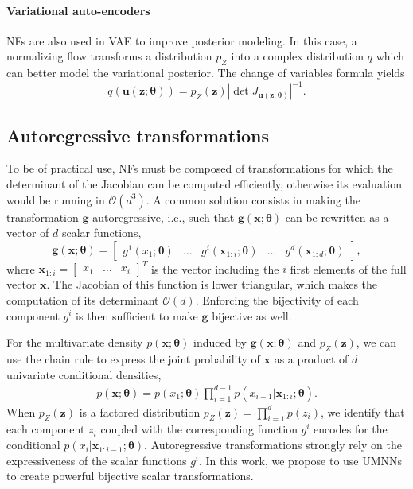 \documentclass{article}
\newcommand{\mc}{\mathcal}
\newcommand{\mb}{\boldsymbol}
\begin{document}
\paragraph{Variational auto-encoders}
NFs are also used in VAE to improve posterior modeling.
In this case, a normalizing flow transforms a distribution $p_Z$ into a complex distribution $q$ which can better model the variational posterior.
The change of variables formula yields
\begin{equation}
    q(\mb{u}(\mb{z}; \mb{\theta})) = p_Z(\mb{z}) \left|\det J_{\mb{u}(\mb{z};\mb{\theta})} \right|^{-1}.\label{eq:NF_VI}
\end{equation}


\subsection{Autoregressive transformations}

To be of practical use, NFs must be composed of transformations for which the determinant of the Jacobian can be computed efficiently, otherwise its evaluation would be running in $\mc{O} (d^3)$.
A common solution consists in making the transformation $\mb{g}$ autoregressive, i.e., such that $\mb{g}(\mb{x};\mb{\theta})$ can be rewritten as a vector of $d$ scalar functions,
$$ \mb{g}(\mb{x};\mb{\theta}) = \begin{bmatrix}
g^1(x_{1}; \mb{\theta}) & \hdots &  g^i(\mb{x}_{1 : i}; \mb{\theta}) & \hdots & g^d(\mb{x}_{1 : d}; \mb{\theta})
\end{bmatrix}, $$
where $\mb{x}_{1 : i} = \begin{bmatrix} x_1 & \hdots & x_i \end{bmatrix}^T$ is the vector including the $i$ first elements of the full vector $\mb{x}$. The Jacobian of this function is lower triangular, which makes the computation of its determinant $\mc{O}(d)$.
Enforcing the bijectivity of each component $g^i$ is then sufficient to make $\mb{g}$ bijective as well.

For the multivariate density $p(\mb{x}; \mb{\theta})$ induced by $\mb{g}(\mb{x};\mb{\theta})$ and $p_Z(\mb{z})$, we can use the chain rule to express the joint probability of $\mb{x}$ as a product of $d$ univariate conditional densities,
\begin{align}
    p(\mb{x}; \mb{\theta}) = p(x_1; \mb{\theta})\prod^{d-1}_{i=1}p(x_{i+1}|\mb{x}_{1:i}; \mb{\theta}).
\end{align}
When $p_Z(\mb{z})$ is a factored distribution $p_Z(\mb{z}) = \prod^{d}_{i=1}p(z_i)$, we identify that each component $z_i$ coupled with the corresponding function $g^i$ encodes for the conditional $p(x_{i}|\mb{x}_{1:i-1}; \mb{\theta})$.
%
Autoregressive transformations strongly rely on the expressiveness of the scalar functions $g^i$.
In this work, we propose to use UMNNs to create powerful bijective scalar transformations.
\end{document}
